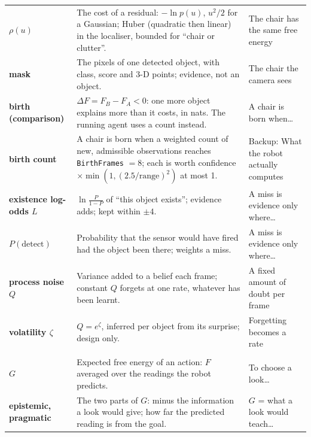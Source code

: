 \documentclass[11pt]{article}
\begin{document}
\begin{longtable}{@{}>{\raggedright\bfseries}p{2.8cm} p{8.9cm} >{\raggedright\arraybackslash}p{4.2cm}@{}}
$\rho(u)$ & The cost of a residual: $-\ln p(u)$, $u^2/2$ for a Gaussian; Huber (quadratic then linear) in the localiser, bounded for ``chair or clutter''. & The chair has the same free energy\\
mask & The pixels of one detected object, with class, score and 3-D points; evidence, not an object. & The chair the camera sees\\
birth (comparison) & $\Delta F=F_B-F_A<0$: one more object explains more than it costs, in nats. The running agent uses a count instead. & A chair is born when\ldots\\
birth count & A chair is born when a weighted count of new, admissible observations reaches \texttt{BirthFrames} $=8$; each is worth confidence $\times\min(1,(2.5/\text{range})^2)$ at most 1. & Backup: What the robot actually computes\\
existence log-odds $L$ & $\ln\frac{P}{1-P}$ of ``this object exists''; evidence adds; kept within $\pm4$. & A miss is evidence only where\ldots\\
$P(\text{detect})$ & Probability that the sensor would have fired had the object been there; weights a miss. & A miss is evidence only where\ldots\\
process noise $Q$ & Variance added to a belief each frame; constant $Q$ forgets at one rate, whatever has been learnt. & A fixed amount of doubt per frame\\
volatility $\zeta$ & $Q=e^\zeta$, inferred per object from its surprise; design only. & Forgetting becomes a rate\\
\midrule
\multicolumn{3}{@{}l}{\emph{Choosing what to do}}\\
$G$ & Expected free energy of an action: $F$ averaged over the readings the robot predicts. & To choose a look\ldots\\
epistemic, pragmatic & The two parts of $G$: minus the information a look would give; how far the predicted reading is from the goal. & $G$ = what a look would teach\ldots\\
\bottomrule
\end{longtable}
\end{document}
